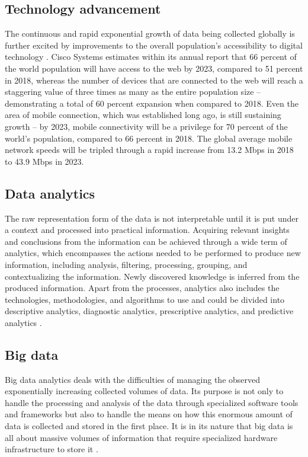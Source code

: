 \documentclass[a4paper,twoside,12pt]{book}
\begin{document}
\subsection{Technology advancement}
The continuous and rapid exponential growth of data being collected globally is further excited by improvements to the overall population's accessibility to digital technology \cite{bib:big_data_analytics}. Cisco Systems estimates within its annual report \cite{bib:cisco_annual} that 66 percent of the world population will have access to the web by 2023, compared to 51 percent in 2018, whereas the number of devices that are connected to the web will reach a staggering value of three times as many as the entire population size – demonstrating a total of 60 percent expansion when compared to 2018. Even the area of mobile connection, which was established long ago, is still sustaining growth – by 2023, mobile connectivity will be a privilege for 70 percent of the world's population, compared to 66 percent in 2018. The global average mobile network speeds will be tripled through a rapid increase from 13.2 Mbps in 2018 to 43.9 Mbps in 2023.

\subsection{Data analytics}
The raw representation form of the data is not interpretable until it is put under a context and processed into practical information.
Acquiring relevant insights and conclusions from the information can be achieved through a wide term of analytics, which encompasses the actions needed to be performed to produce new information, including analysis, filtering, processing, grouping, and contextualizing the information. Newly discovered knowledge is inferred from the produced information.
Apart from the processes, analytics also includes the technologies, methodologies, and algorithms to use and could be divided into descriptive analytics, diagnostic analytics, prescriptive analytics, and predictive analytics \cite{bib:big_data_analytics}.

\subsection{Big data}

Big data analytics deals with the difficulties of managing the observed exponentially increasing collected volumes of data. Its purpose is not only to handle the processing and analysis of the data through specialized software tools and frameworks but also to handle the means on how this enormous amount of data is collected and stored in the first place. It is in its nature that big data is all about massive volumes of information that require specialized hardware infrastructure to store it \cite{bib:big_data_analytics}.
\end{document}
